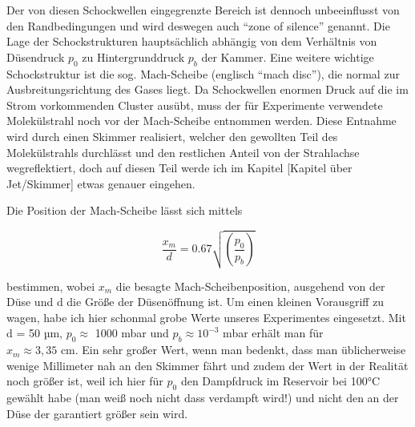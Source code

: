 Der von diesen Schockwellen eingegrenzte Bereich ist dennoch unbeeinflusst von den Randbedingungen und wird deswegen auch \enquote{zone of silence} genannt. 
Die Lage der Schockstrukturen hauptsächlich abhängig von dem Verhältnis von Düsendruck $p_0$ zu Hintergrunddruck $p_b$ der Kammer. Eine weitere wichtige Schockstruktur ist die sog. Mach-Scheibe (englisch \enquote{mach disc}), die normal zur Ausbreitungsrichtung des Gases liegt. Da Schockwellen enormen Druck auf die im Strom vorkommenden Cluster ausübt, muss der für Experimente verwendete Molekülstrahl noch vor der Mach-Scheibe entnommen werden. Diese Entnahme wird durch einen Skimmer realisiert, welcher den gewollten Teil des Molekülstrahls durchlässt und den restlichen Anteil von der Strahlachse wegreflektiert, doch auf diesen Teil werde ich im Kapitel [Kapitel über Jet/Skimmer] etwas genauer eingehen. 

Die Position der Mach-Scheibe lässt sich mittels

\begin{equation}
\frac{x_m}{d}=0.67 \sqrt{\left( \frac{p_0}{p_b}\right)}
\end{equation}

bestimmen, wobei $x_m$ die besagte Mach-Scheibenposition, ausgehend von der Düse und d die Größe der Düsenöffnung ist.
Um einen kleinen Vorausgriff zu wagen, habe ich hier schonmal grobe Werte unseres Experimentes eingesetzt. Mit d = 50 µm, $p_0 \approx$ 1000 mbar und $p_b \approx 10^{-3}$  mbar erhält man für\\ $x_m \approx 3,35$ cm. Ein sehr großer Wert, wenn man bedenkt, dass man üblicherweise wenige Millimeter nah an den Skimmer fährt und zudem der Wert in der Realität noch größer ist, weil ich hier für $p_0$ den Dampfdruck im Reservoir bei 100°C gewählt habe (man weiß noch nicht dass verdampft wird!) und nicht den an der Düse der garantiert größer sein wird.



